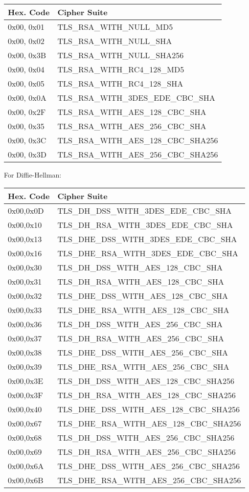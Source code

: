 \begin{tabular}{l l}
Hex. Code & Cipher Suite \\ \hline
0x00, 0x01 & TLS\_RSA\_WITH\_NULL\_MD5 \\
0x00, 0x02 & TLS\_RSA\_WITH\_NULL\_SHA \\
0x00, 0x3B & TLS\_RSA\_WITH\_NULL\_SHA256 \\
0x00, 0x04 & TLS\_RSA\_WITH\_RC4\_128\_MD5 \\
0x00, 0x05 & TLS\_RSA\_WITH\_RC4\_128\_SHA \\
0x00, 0x0A & TLS\_RSA\_WITH\_3DES\_EDE\_CBC\_SHA \\
0x00, 0x2F & TLS\_RSA\_WITH\_AES\_128\_CBC\_SHA \\
0x00, 0x35 & TLS\_RSA\_WITH\_AES\_256\_CBC\_SHA \\
0x00, 0x3C & TLS\_RSA\_WITH\_AES\_128\_CBC\_SHA256 \\
0x00, 0x3D & TLS\_RSA\_WITH\_AES\_256\_CBC\_SHA256 \\
\end{tabular}


For Diffie-Hellman:

\begin{tabular}{l l}
Hex. Code & Cipher Suite \\ \hline
0x00,0x0D & TLS\_DH\_DSS\_WITH\_3DES\_EDE\_CBC\_SHA \\  
0x00,0x10 & TLS\_DH\_RSA\_WITH\_3DES\_EDE\_CBC\_SHA \\     
0x00,0x13 & TLS\_DHE\_DSS\_WITH\_3DES\_EDE\_CBC\_SHA \\  
0x00,0x16 & TLS\_DHE\_RSA\_WITH\_3DES\_EDE\_CBC\_SHA \\ 
0x00,0x30 & TLS\_DH\_DSS\_WITH\_AES\_128\_CBC\_SHA \\ 
0x00,0x31 & TLS\_DH\_RSA\_WITH\_AES\_128\_CBC\_SHA \\   
0x00,0x32 & TLS\_DHE\_DSS\_WITH\_AES\_128\_CBC\_SHA \\   
0x00,0x33 & TLS\_DHE\_RSA\_WITH\_AES\_128\_CBC\_SHA \\  
0x00,0x36 & TLS\_DH\_DSS\_WITH\_AES\_256\_CBC\_SHA \\  
0x00,0x37 & TLS\_DH\_RSA\_WITH\_AES\_256\_CBC\_SHA \\   
0x00,0x38 & TLS\_DHE\_DSS\_WITH\_AES\_256\_CBC\_SHA \\   
0x00,0x39 & TLS\_DHE\_RSA\_WITH\_AES\_256\_CBC\_SHA \\  
0x00,0x3E & TLS\_DH\_DSS\_WITH\_AES\_128\_CBC\_SHA256 \\  
0x00,0x3F & TLS\_DH\_RSA\_WITH\_AES\_128\_CBC\_SHA256 \\
0x00,0x40 & TLS\_DHE\_DSS\_WITH\_AES\_128\_CBC\_SHA256 \\
0x00,0x67 & TLS\_DHE\_RSA\_WITH\_AES\_128\_CBC\_SHA256 \\
0x00,0x68 & TLS\_DH\_DSS\_WITH\_AES\_256\_CBC\_SHA256 \\
0x00,0x69 & TLS\_DH\_RSA\_WITH\_AES\_256\_CBC\_SHA256 \\
0x00,0x6A & TLS\_DHE\_DSS\_WITH\_AES\_256\_CBC\_SHA256 \\
0x00,0x6B & TLS\_DHE\_RSA\_WITH\_AES\_256\_CBC\_SHA256 \\
\end{tabular}

